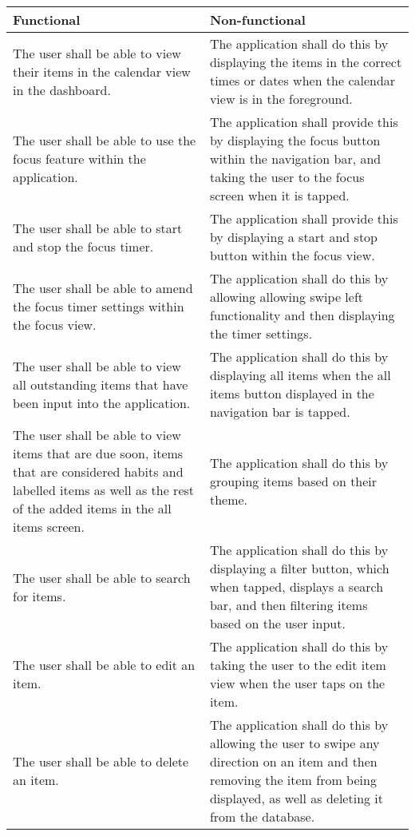 \begin{table}[H]
    \centering
    \begin{tabular}{|p{7cm}|p{7cm}|}
        \hline
        Functional& Non-functional\\
        \hline
        The user shall be able to view their items in the calendar view in the dashboard.&  The application shall do this by displaying the items in the correct times or dates when the calendar view is in the foreground.\\
        \hline
        The user shall be able to use the focus feature within the application.& The application shall provide this by displaying the focus button within the navigation bar, and taking the user to the focus screen when it is tapped.\\
        \hline
        The user shall be able to start and stop the focus timer.&  The application shall provide this by displaying a start and stop button within the focus view.\\
        \hline
        The user shall be able to amend the focus timer settings within the focus view.& The application shall do this by allowing allowing swipe left functionality and then displaying the timer settings.\\
        \hline
        The user shall be able to view all outstanding items that have been input into the application.& The application shall do this by displaying all items when the all items button displayed in the navigation bar is tapped.\\
        \hline
        The user shall be able to view items that are due soon, items that are considered habits and labelled items as well as the rest of the added items in the all items screen.& The application shall do this by grouping items based on their theme.\\
        \hline
        The user shall be able to search for items.& The application shall do this by displaying a filter button, which when tapped, displays a search bar, and then filtering items based on the user input.\\
        \hline
        The user shall be able to edit an item.&  The application shall do this by taking the user to the edit item view when the user taps on the item.\\
        \hline
        The user shall be able to delete an item.& The application shall do this by allowing the user to swipe any direction on an item and then removing the item from being displayed, as well as deleting it from the database.\\

\end{tabular}
\end{table}
